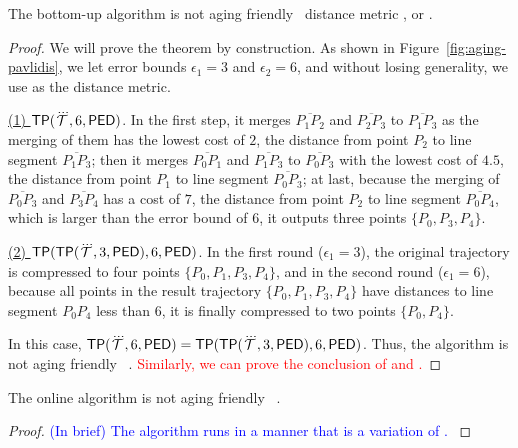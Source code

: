 \begin{theorem}
\label{theo-aging-tp}
The bottom-up algorithm \tpa is not aging friendly \wrt~distance metric \ped, \sed or \dad.
\end{theorem}

\begin{proof}
We will prove the theorem by construction.
As shown in Figure~\ref{fig:aging-pavlidis}, we let error bounds $\epsilon_1 =3$ and $\epsilon_2=6$, and without losing generality, we use \ped as the distance metric.

\underline{(1) ${{\mathsf{TP}}}(\dddot{\mathcal{T}}, 6, {\mathsf{PED}})$}. In the first step, it merges $\overline{P_1P_2}$ and $\overline{P_2P_3}$ to $\overline{P_1P_3}$ as the merging of them has the lowest cost of $2$, the distance from point $P_2$ to line segment $\overline{P_1P_3}$; then it merges $\overline{P_0P_1}$ and $\overline{P_1P_3}$ to $\overline{P_0P_3}$ with the lowest cost of $4.5$, the distance from point $P_1$ to line segment $\overline{P_0P_3}$; at last, because the merging of $\overline{P_0P_3}$ and $\overline{P_3P_4}$ has a cost of $7$, the distance from point $P_2$ to line segment $\overline{P_0P_4}$, which is larger than the error bound of $6$, it outputs three points $\{P_0, P_3, P_4\}$.

\underline{(2) ${{\mathsf{TP}}}({\mathsf{TP}}(\dddot{\mathcal{T}}, 3, {\mathsf{PED}}), 6, {\mathsf{PED}})$}. In the first round ($\epsilon_1=3$), the original trajectory is compressed to four points $\{P_0, P_1, P_3, P_4\}$, and in the second round ($\epsilon_1=6$), because all points in the result trajectory $\{P_0, P_1, P_3, P_4\}$ have distances to line segment $P_0P_4$ less than $6$, it is finally compressed to two points $\{P_0, P_4\}$.

In this case, ${{\mathsf{TP}}}(\dddot{\mathcal{T}}, 6, {\mathsf{PED}}) = {{\mathsf{TP}}}({\mathsf{TP}}(\dddot{\mathcal{T}}, 3, {\mathsf{PED}}), 6, {\mathsf{PED}})$. Thus, the \tpa algorithm is not aging friendly \wrt~\ped.
\textcolor{red}{Similarly, we can prove the conclusion of \sed and \dad.}
\end{proof}

\begin{lemma}
	The online algorithm \squishe is not aging friendly \wrt~\sed.
\end{lemma}

\begin{proof}
	\textcolor{blue}{(In brief) The \squishe algorithm runs in a manner that is a variation of \tpa. }
\end{proof}

